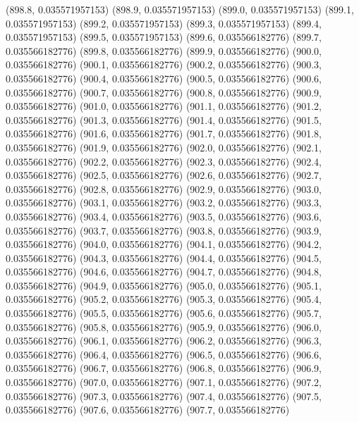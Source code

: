 {					(898.8, 0.035571957153)
					(898.9, 0.035571957153)
					(899.0, 0.035571957153)
					(899.1, 0.035571957153)
					(899.2, 0.035571957153)
					(899.3, 0.035571957153)
					(899.4, 0.035571957153)
					(899.5, 0.035571957153)
					(899.6, 0.035566182776)
					(899.7, 0.035566182776)
					(899.8, 0.035566182776)
					(899.9, 0.035566182776)
					(900.0, 0.035566182776)
					(900.1, 0.035566182776)
					(900.2, 0.035566182776)
					(900.3, 0.035566182776)
					(900.4, 0.035566182776)
					(900.5, 0.035566182776)
					(900.6, 0.035566182776)
					(900.7, 0.035566182776)
					(900.8, 0.035566182776)
					(900.9, 0.035566182776)
					(901.0, 0.035566182776)
					(901.1, 0.035566182776)
					(901.2, 0.035566182776)
					(901.3, 0.035566182776)
					(901.4, 0.035566182776)
					(901.5, 0.035566182776)
					(901.6, 0.035566182776)
					(901.7, 0.035566182776)
					(901.8, 0.035566182776)
					(901.9, 0.035566182776)
					(902.0, 0.035566182776)
					(902.1, 0.035566182776)
					(902.2, 0.035566182776)
					(902.3, 0.035566182776)
					(902.4, 0.035566182776)
					(902.5, 0.035566182776)
					(902.6, 0.035566182776)
					(902.7, 0.035566182776)
					(902.8, 0.035566182776)
					(902.9, 0.035566182776)
					(903.0, 0.035566182776)
					(903.1, 0.035566182776)
					(903.2, 0.035566182776)
					(903.3, 0.035566182776)
					(903.4, 0.035566182776)
					(903.5, 0.035566182776)
					(903.6, 0.035566182776)
					(903.7, 0.035566182776)
					(903.8, 0.035566182776)
					(903.9, 0.035566182776)
					(904.0, 0.035566182776)
					(904.1, 0.035566182776)
					(904.2, 0.035566182776)
					(904.3, 0.035566182776)
					(904.4, 0.035566182776)
					(904.5, 0.035566182776)
					(904.6, 0.035566182776)
					(904.7, 0.035566182776)
					(904.8, 0.035566182776)
					(904.9, 0.035566182776)
					(905.0, 0.035566182776)
					(905.1, 0.035566182776)
					(905.2, 0.035566182776)
					(905.3, 0.035566182776)
					(905.4, 0.035566182776)
					(905.5, 0.035566182776)
					(905.6, 0.035566182776)
					(905.7, 0.035566182776)
					(905.8, 0.035566182776)
					(905.9, 0.035566182776)
					(906.0, 0.035566182776)
					(906.1, 0.035566182776)
					(906.2, 0.035566182776)
					(906.3, 0.035566182776)
					(906.4, 0.035566182776)
					(906.5, 0.035566182776)
					(906.6, 0.035566182776)
					(906.7, 0.035566182776)
					(906.8, 0.035566182776)
					(906.9, 0.035566182776)
					(907.0, 0.035566182776)
					(907.1, 0.035566182776)
					(907.2, 0.035566182776)
					(907.3, 0.035566182776)
					(907.4, 0.035566182776)
					(907.5, 0.035566182776)
					(907.6, 0.035566182776)
					(907.7, 0.035566182776)
}
